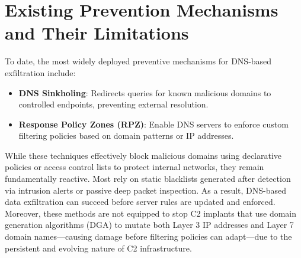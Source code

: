 \documentclass [11pt, proquest] {uwthesis}[2020/02/24]
\begin{document}
\section{Existing Prevention Mechanisms and Their Limitations}
To date, the most widely deployed preventive mechanisms for DNS-based exfiltration include:
\begin{itemize}
\item \textbf{DNS Sinkholing}: Redirects queries for known malicious domains to controlled endpoints, preventing external resolution.
\item \textbf{Response Policy Zones (RPZ)}: Enable DNS servers to enforce custom filtering policies based on domain patterns or IP addresses.
\end{itemize}
While these techniques effectively block malicious domains using declarative policies or access control lists to protect internal networks, they remain fundamentally reactive. Most rely on static blacklists generated after detection via intrusion alerts or passive deep packet inspection. As a result, DNS-based data exfiltration can succeed before server rules are updated and enforced. Moreover, these methods are not equipped to stop C2 implants that use domain generation algorithms (DGA) to mutate both Layer 3 IP addresses and Layer 7 domain names—causing damage before filtering policies can adapt—due to the persistent and evolving nature of C2 infrastructure.


\end{document}
